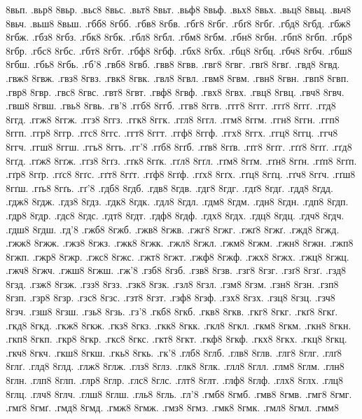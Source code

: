 {8вьп.
.вьр8
8вьр.
.вьс8
8вьс.
.вьт8
8вьт.
.вьф8
8вьф.
.вьх8
8вьх.
.вьц8
8вьц.
.вьч8
8вьч.
.вьш8
8вьш.
.гбб8
8гбб.
.гбв8
8гбв.
.гбг8
8гбг.
.гбґ8
8гбґ.
.гбд8
8гбд.
.гбж8
8гбж.
.гбз8
8гбз.
.гбк8
8гбк.
.гбл8
8гбл.
.гбм8
8гбм.
.гбн8
8гбн.
.гбп8
8гбп.
.гбр8
8гбр.
.гбс8
8гбс.
.гбт8
8гбт.
.гбф8
8гбф.
.гбх8
8гбх.
.гбц8
8гбц.
.гбч8
8гбч.
.гбш8
8гбш.
.гбь8
8гбь.
.гб'8
.гвб8
8гвб.
.гвв8
8гвв.
.гвг8
8гвг.
.гвґ8
8гвґ.
.гвд8
8гвд.
.гвж8
8гвж.
.гвз8
8гвз.
.гвк8
8гвк.
.гвл8
8гвл.
.гвм8
8гвм.
.гвн8
8гвн.
.гвп8
8гвп.
.гвр8
8гвр.
.гвс8
8гвс.
.гвт8
8гвт.
.гвф8
8гвф.
.гвх8
8гвх.
.гвц8
8гвц.
.гвч8
8гвч.
.гвш8
8гвш.
.гвь8
8гвь.
.гв'8
.ггб8
8ггб.
.ггв8
8ггв.
.ггг8
8ггг.
.ггґ8
8ггґ.
.ггд8
8ггд.
.ггж8
8ггж.
.ггз8
8ггз.
.ггк8
8ггк.
.ггл8
8ггл.
.ггм8
8ггм.
.ггн8
8ггн.
.ггп8
8ггп.
.ггр8
8ггр.
.ггс8
8ггс.
.ггт8
8ггт.
.ггф8
8ггф.
.ггх8
8ггх.
.ггц8
8ггц.
.ггч8
8ггч.
.ггш8
8ггш.
.ггь8
8ггь.
.гг'8
.гґб8
8гґб.
.гґв8
8гґв.
.гґг8
8гґг.
.гґґ8
8гґґ.
.гґд8
8гґд.
.гґж8
8гґж.
.гґз8
8гґз.
.гґк8
8гґк.
.гґл8
8гґл.
.гґм8
8гґм.
.гґн8
8гґн.
.гґп8
8гґп.
.гґр8
8гґр.
.гґс8
8гґс.
.гґт8
8гґт.
.гґф8
8гґф.
.гґх8
8гґх.
.гґц8
8гґц.
.гґч8
8гґч.
.гґш8
8гґш.
.гґь8
8гґь.
.гґ'8
.гдб8
8гдб.
.гдв8
8гдв.
.гдг8
8гдг.
.гдґ8
8гдґ.
.гдд8
8гдд.
.гдж8
8гдж.
.гдз8
8гдз.
.гдк8
8гдк.
.гдл8
8гдл.
.гдм8
8гдм.
.гдн8
8гдн.
.гдп8
8гдп.
.гдр8
8гдр.
.гдс8
8гдс.
.гдт8
8гдт.
.гдф8
8гдф.
.гдх8
8гдх.
.гдц8
8гдц.
.гдч8
8гдч.
.гдш8
8гдш.
.гд'8
.гжб8
8гжб.
.гжв8
8гжв.
.гжг8
8гжг.
.гжґ8
8гжґ.
.гжд8
8гжд.
.гжж8
8гжж.
.гжз8
8гжз.
.гжк8
8гжк.
.гжл8
8гжл.
.гжм8
8гжм.
.гжн8
8гжн.
.гжп8
8гжп.
.гжр8
8гжр.
.гжс8
8гжс.
.гжт8
8гжт.
.гжф8
8гжф.
.гжх8
8гжх.
.гжц8
8гжц.
.гжч8
8гжч.
.гжш8
8гжш.
.гж'8
.гзб8
8гзб.
.гзв8
8гзв.
.гзг8
8гзг.
.гзґ8
8гзґ.
.гзд8
8гзд.
.гзж8
8гзж.
.гзз8
8гзз.
.гзк8
8гзк.
.гзл8
8гзл.
.гзм8
8гзм.
.гзн8
8гзн.
.гзп8
8гзп.
.гзр8
8гзр.
.гзс8
8гзс.
.гзт8
8гзт.
.гзф8
8гзф.
.гзх8
8гзх.
.гзц8
8гзц.
.гзч8
8гзч.
.гзш8
8гзш.
.гзь8
8гзь.
.гз'8
.гкб8
8гкб.
.гкв8
8гкв.
.гкг8
8гкг.
.гкґ8
8гкґ.
.гкд8
8гкд.
.гкж8
8гкж.
.гкз8
8гкз.
.гкк8
8гкк.
.гкл8
8гкл.
.гкм8
8гкм.
.гкн8
8гкн.
.гкп8
8гкп.
.гкр8
8гкр.
.гкс8
8гкс.
.гкт8
8гкт.
.гкф8
8гкф.
.гкх8
8гкх.
.гкц8
8гкц.
.гкч8
8гкч.
.гкш8
8гкш.
.гкь8
8гкь.
.гк'8
.глб8
8глб.
.глв8
8глв.
.глг8
8глг.
.глґ8
8глґ.
.глд8
8глд.
.глж8
8глж.
.глз8
8глз.
.глк8
8глк.
.глл8
8глл.
.глм8
8глм.
.глн8
8глн.
.глп8
8глп.
.глр8
8глр.
.глс8
8глс.
.глт8
8глт.
.глф8
8глф.
.глх8
8глх.
.глц8
8глц.
.глч8
8глч.
.глш8
8глш.
.гль8
8гль.
.гл'8
.гмб8
8гмб.
.гмв8
8гмв.
.гмг8
8гмг.
.гмґ8
8гмґ.
.гмд8
8гмд.
.гмж8
8гмж.
.гмз8
8гмз.
.гмк8
8гмк.
.гмл8
8гмл.
.гмм8
}
